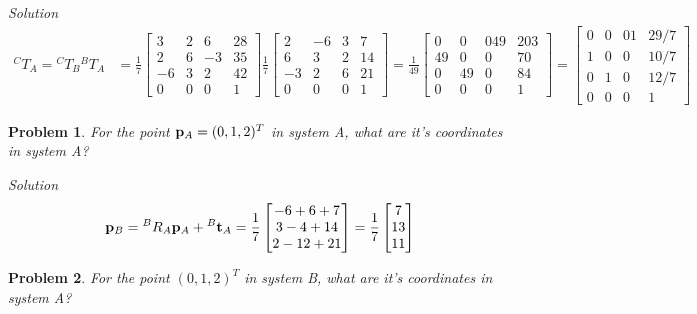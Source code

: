 \documentclass{article}
\newtheorem{prob}{Problem}
\numberwithin{prob}{section}
\newenvironment{solution}{\emph{Solution}}{}
\begin{document}
\begin{solution}
\begin{align}
  {}^CT_A = {}^CT_B {}^BT_A 
  &= 
  \frac{1}{7}\begin{bmatrix}
    3 & 2 & 6 & 28\\
    2 & 6 & -3 & 35\\
    -6 & 3 & 2 & 42\\
    0 & 0 & 0 & 1
    \end{bmatrix}
  \frac{1}{7}\begin{bmatrix}
    2 & -6 & 3 & 7\\
    6 & 3& 2 & 14\\
    -3 & 2 & 6 & 21\\
    0 & 0 & 0 & 1
  \end{bmatrix}
    = \frac{1}{49}\begin{bmatrix}
      0 & 0 & 0 49 & 203 \\
      49 & 0 & 0 & 70 \\
      0 & 49 & 0 & 84\\
      0 & 0 & 0 & 1
    \end{bmatrix}
    = \begin{bmatrix}
      0 & 0 & 0 1 & 29/7 \\
      1 & 0 & 0 & 10/7 \\
      0 & 1 & 0 & 12/7\\
      0 & 0 & 0 & 1
    \end{bmatrix}
\end{align}
\end{solution}
\begin{prob}
For the point $\mathbf{p}_A = (0, 1, 2)^T$ in system A, what are it's coordinates in system A?
\end{prob}
\begin{solution}
\begin{align}
  \mathbf{p}_B = {}^BR_A \mathbf{p}_A + {}^B\mathbf{t}_A
  = \frac{1}{7} \begin{bmatrix}
    -6+6+7\\
    3-4+14\\
    2-12+21
  \end{bmatrix}
  = \frac{1}{7} \begin{bmatrix}
    7\\
    13\\
    11
  \end{bmatrix}
\end{align}

\end{solution}
\begin{prob}
For the point $(0, 1, 2)^T$ in system B, what are it's coordinates in system A?
\end{prob}
\end{document}
